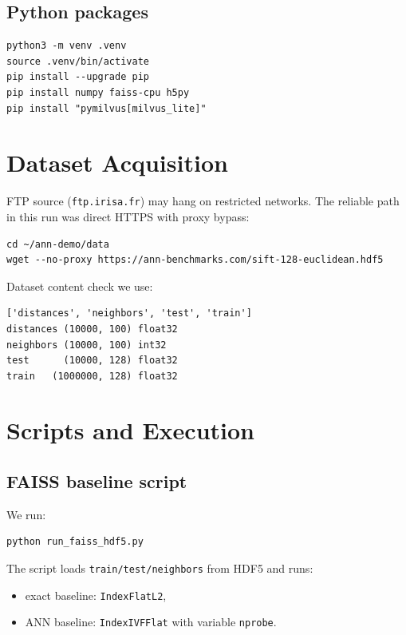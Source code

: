 \documentclass[11pt,a4paper]{article}
\begin{document}
\subsection{Python packages}

\begin{verbatim}
python3 -m venv .venv
source .venv/bin/activate
pip install --upgrade pip
pip install numpy faiss-cpu h5py
pip install "pymilvus[milvus_lite]"
\end{verbatim}

\section{Dataset Acquisition}

FTP source (\texttt{ftp.irisa.fr}) may hang on restricted networks.
The reliable path in this run was direct HTTPS with proxy bypass:

\begin{verbatim}
cd ~/ann-demo/data
wget --no-proxy https://ann-benchmarks.com/sift-128-euclidean.hdf5
\end{verbatim}

Dataset content check we use:
\begin{verbatim}
['distances', 'neighbors', 'test', 'train']
distances (10000, 100) float32
neighbors (10000, 100) int32
test      (10000, 128) float32
train   (1000000, 128) float32
\end{verbatim}

\section{Scripts and Execution}

\subsection{FAISS baseline script}
\label{sec:faiss-script}

We run:
\begin{verbatim}
python run_faiss_hdf5.py
\end{verbatim}

The script loads \texttt{train/test/neighbors} from HDF5 and runs:
\begin{itemize}[leftmargin=*]
  \item exact baseline: \texttt{IndexFlatL2},
  \item ANN baseline: \texttt{IndexIVFFlat} with variable \texttt{nprobe}.
\end{itemize}
\end{document}
